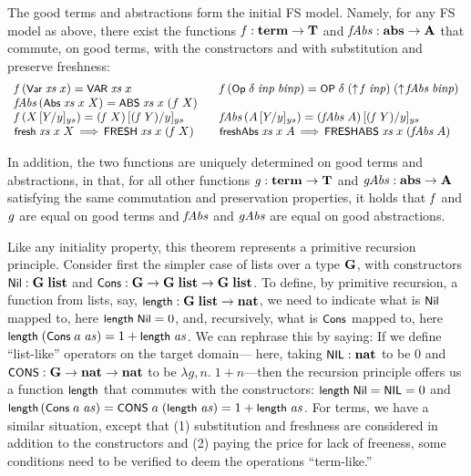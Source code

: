 \documentclass{llncs}
\begin{document}
\begin{thm}\label{th-rec} \rm
The good terms and abstractions form the initial FS model. Namely, 
for any FS model as above, there exist the functions $\f:\term \ra \T$ 
and $\fAbs : \abs \ra \A$ that commute, on good terms, 
with the constructors and with substitution and preserve freshness: 
%
$$
\begin{array}{ll}
\f\,(\Var\;\xs\;x) = \VAR\;\xs\;x
&\hspace*{2ex}
\f\,(\Op\;\delta\;\inp\;\binp) = \OP\;\delta\;(\lift\,\f\;\inp)\;(\lift\,\fAbs\;\binp)
\\
\fAbs\,(\Abs\;\xs\;x\;X) = \ABS\;\xs\;x\;(f\;X)
&\hspace*{2ex}
\\
\f\,(X\,[Y/y]_{ys}) = (\f\;X)\,[(\f\;Y)/y]_{ys} 
&\hspace*{2ex}
\fAbs\,(A\,[Y/y]_{ys}) = (\fAbs\;A)\,[(\f\;Y)/y]_{ys} 
\\
\fresh\;\xs\;x\;X \,\Lra\, \FRESH\;\xs\;x\;(\f\;X) 
&\hspace*{2ex}
\freshAbs\;\xs\;x\;A \,\Lra\, \FRESHABS\;\xs\;x\;(\fAbs\;A)
\end{array}
$$
%
\par
In addition, the two functions are uniquely determined on good terms and abstractions, 
in that, for all other functions $\g:\term \ra \T$ 
and $\gAbs :\abs \ra \A$ satisfying the same commutation and preservation properties, 
it holds that 
$\f$ and $\g$ are equal on good terms and $\fAbs$ and $\gAbs$ are equal on good abstractions.
\end{thm}  

Like any initiality property, this theorem represents a primitive recursion principle. 
Consider first the simpler case of lists over a type $\G$, with constructors $\Nil : \G\;\llist$ 
and $\Cons : \G \ra \G\;\llist \ra \G\;\llist$. To define, by primitive recursion, 
a function from lists, say, $\llength : \G\;\llist \ra \nat$, we need to indicate 
what is $\Nil$ mapped to, here $\llength\;\Nil = 0$, and, recursively, what 
is $\Cons$ mapped to, here $\llength\;(\Cons\;a\;\as) = 1 + \llength\;\as$. 
We can rephrase this by saying: If we define ``list-like'' operators on the target domain---
here, taking $\NIL : \nat$ to be $0$ and $\CONS : \G \ra \nat \ra \nat$ to be $\lambda g,n.\;1+n$---then 
the recursion principle offers us a function $\llength$ that commutes with the constructors: 
$\llength\;\Nil = \NIL = 0$ and $\llength\,(\Cons\;a\;\as) = \CONS\;a\;(\llength\;\as) = 1 + \llength\;\as$. 
%
For terms, we have a similar situation, except that (1) substitution and freshness 
are considered in addition to the constructors and 
(2) paying the price for lack of freeness, some conditions need to be verified  
to %
deem the operations ``term-like.''  
\end{document}
